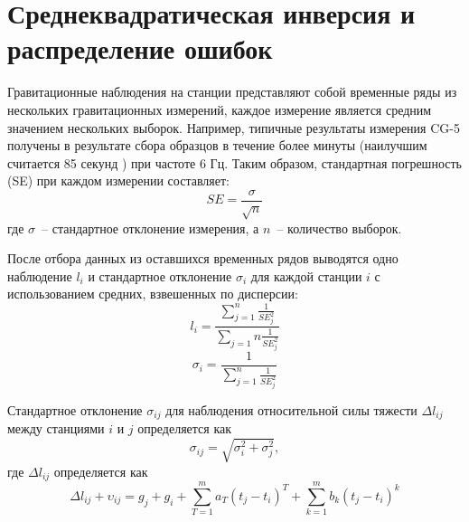 \chapter[Среднеквадратическая инверсия и распределение ошибок]{Среднеквадратическая инверсия и распределение ошибок}
\label{chap:least-square_inversion_and_error_propagation}

Гравитационные наблюдения на станции представляют собой временные ряды из
нескольких гравитационных измерений, каждое измерение является средним значением
нескольких выборок. Например, типичные результаты измерения CG-5 получены в
результате сбора образцов в течение более минуты (наилучшим считается 85 секунд
\cite{merlet_micro-gravity_2008}) при частоте 6 Гц. Таким образом, стандартная погрешность
(SE) при каждом измерении составляет:
\begin{equation}
    SE = \frac{\sigma}{\sqrt{n}}
\end{equation}
где $\sigma$~-- стандартное отклонение измерения, а $n$~-- количество выборок.

После отбора данных из оставшихся временных рядов выводятся одно наблюдение $l_i$
и стандартное отклонение $\sigma_i$ для каждой станции $i$ с использованием средних,
взвешенных по дисперсии:
\begin{equation}
    l_i = \frac{\sum_{j=1}^{n}\frac{1}{SE^2_j}}{\sum_{j=1}{n}\frac{1}{SE^2_j}}
\end{equation}
\begin{equation}
    \sigma_i = \frac{1}{\sum_{j=1}^{n}\frac{1}{SE_j^2}}
\end{equation}

Стандартное отклонение $\sigma_{ij}$ для наблюдения относительной силы тяжести
$\Delta l_{ij}$ между станциями $i$ и $j$ определяется как
\begin{equation}
    \sigma_{ij} = \sqrt{\sigma_i^2 + \sigma_j^2},
\end{equation}
где $\Delta l_{ij}$ определяется как
\begin{equation}
    \Delta l_{ij} + \upsilon_{ij} = g_j + g_i + \sum_{T=1}^{m} a_T\left(t_j - t_i\right)^T + \sum_{k=1}^{m} b_k \left(t_j - t_i\right)^k
\end{equation}

